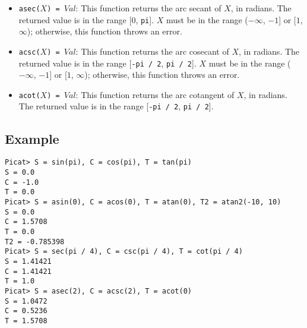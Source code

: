 \begin{itemize}
\item \texttt{asec($X$) = $Val$}: This function returns the arc secant of $X$, in radians.  The returned value is in the range [$0$, \texttt{pi}].  $X$ must be in the range ($-\infty$, $-1$] or [$1$, $\infty$); otherwise, this function throws an error.
\item \texttt{acsc($X$) = $Val$}: This function returns the arc cosecant of $X$, in radians.  The returned value is in the range [\texttt{-pi / 2}, \texttt{pi / 2}].  $X$ must be in the range ($-\infty$, $-1$] or [$1$, $\infty$); otherwise, this function throws an error.
\item \texttt{acot($X$) = $Val$}: This function returns the arc cotangent of $X$, in radians.  The returned value is in the range [\texttt{-pi / 2}, \texttt{pi / 2}].
\end{itemize}

\subsection*{Example}
\begin{verbatim}
Picat> S = sin(pi), C = cos(pi), T = tan(pi)
S = 0.0
C = -1.0
T = 0.0
Picat> S = asin(0), C = acos(0), T = atan(0), T2 = atan2(-10, 10)
S = 0.0
C = 1.5708
T = 0.0
T2 = -0.785398
Picat> S = sec(pi / 4), C = csc(pi / 4), T = cot(pi / 4)
S = 1.41421
C = 1.41421
T = 1.0
Picat> S = asec(2), C = acsc(2), T = acot(0)
S = 1.0472
C = 0.5236
T = 1.5708
\end{verbatim}

